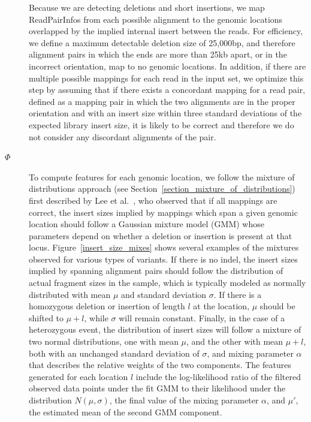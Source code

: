 \begin{description}
\item[] Because we are detecting deletions and short insertions, we map ReadPairInfos from each possible alignment to the genomic locations overlapped by the implied internal insert between the reads. For efficiency, we define a maximum detectable deletion size of 25,000bp, and therefore alignment pairs in which the ends are more than 25kb apart, or in the incorrect orientation, map to no genomic locations. In addition, if there are multiple possible mappings for each read in the input set, we optimize this step by assuming that if there exists a concordant mapping for a read pair, defined as a mapping pair in which the two alignments are in the proper orientation and with an insert size within three standard deviations of the expected library insert size, it is likely to be correct and therefore we do not consider any discordant alignments of the pair.

\item[$\Phi$] To compute features for each genomic location, we follow the mixture of distributions approach (see Section~\ref{section_mixture_of_distributions}) first described by Lee et al.~\cite{Lee:2009da}, who observed that if all mappings are correct, the insert sizes implied by mappings which span a given genomic location should follow a Gaussian mixture model (GMM) whose parameters depend on whether a deletion or insertion is present at that locus. Figure~\ref{insert_size_mixes} shows several examples of the mixtures observed for various types of variants. If there is no indel, the insert sizes implied by spanning alignment pairs should follow the distribution of actual fragment sizes in the sample, which is typically modeled as normally distributed with mean $\mu$ and standard deviation $\sigma$. If there is a homozygous deletion or insertion of length $l$ at the location, $\mu$ should be shifted to $\mu + l$, while $\sigma$ will remain constant. Finally, in the case of a heterozygous event, the distribution of insert sizes will follow a mixture of two normal distributions, one with mean $\mu$, and the other with mean $\mu + l$, both with an unchanged standard deviation of $\sigma$, and mixing parameter $\alpha$ that describes the relative weights of the two components. The features generated for each location $l$ include the log-likelihood ratio of the filtered observed data points under the fit GMM to their likelihood under the distribution $N(\mu,\sigma)$, the final value of the mixing parameter $\alpha$, and $\mu'$, the estimated mean of the second GMM component. 


\end{description}
